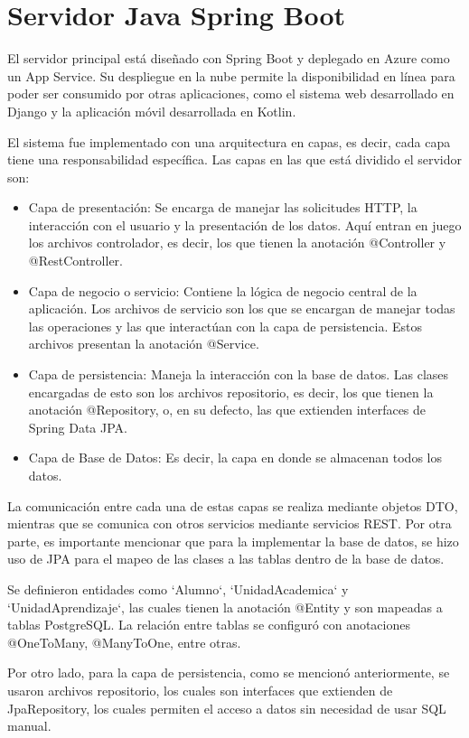 \section{Servidor Java Spring Boot}

El servidor principal está diseñado con Spring Boot y deplegado en Azure como un App Service. Su despliegue en la nube permite la disponibilidad en línea para poder ser consumido por otras aplicaciones, como el sistema web desarrollado en Django y la aplicación móvil desarrollada en Kotlin.

El sistema fue implementado con una arquitectura en capas, es decir, cada capa tiene una responsabilidad específica. Las capas en las que está dividido el servidor son:
\begin{itemize}
	\item Capa de presentación: Se encarga de manejar las solicitudes HTTP, la interacción con el usuario y la presentación de los datos. Aquí entran en juego los archivos controlador, es decir, los que tienen la anotación @Controller y @RestController.
	\item Capa de negocio o servicio: Contiene la lógica de negocio central de la aplicación. Los archivos de servicio son los que se encargan de manejar todas las operaciones y las que interactúan con la capa de persistencia. Estos archivos presentan la anotación @Service.
	\item Capa de persistencia: Maneja la interacción con la base de datos. Las clases encargadas de esto son los archivos repositorio, es decir, los que tienen la anotación @Repository, o, en su defecto, las que extienden interfaces de Spring Data JPA.
	\item Capa de Base de Datos: Es decir, la capa en donde se almacenan todos los datos.
\end{itemize}
La comunicación entre cada una de estas capas se realiza mediante objetos DTO, mientras que se comunica con otros servicios mediante servicios REST. Por otra parte, es importante mencionar que para la implementar la base de datos, se hizo uso de JPA para el mapeo de las clases a las tablas dentro de la base de datos.

Se definieron entidades como `Alumno`, `UnidadAcademica` y `UnidadAprendizaje`, las cuales tienen la anotación @Entity y son mapeadas a tablas PostgreSQL. La relación entre tablas se configuró con anotaciones @OneToMany, @ManyToOne, entre otras. 

Por otro lado, para la capa de persistencia, como se mencionó anteriormente, se usaron archivos repositorio, los cuales son interfaces que extienden de JpaRepository, los cuales permiten el acceso a datos sin necesidad de usar SQL manual.

